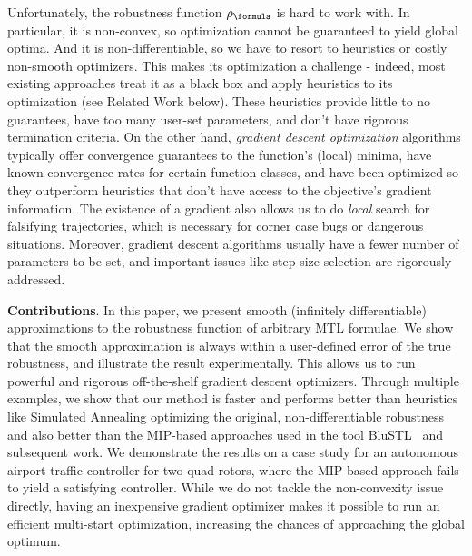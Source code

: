 Unfortunately, the robustness function $\robf$ is hard to work with.
In particular, it is non-convex, so optimization cannot be guaranteed to yield global optima.
And it is non-differentiable, so we have to resort to heuristics or costly non-smooth optimizers. 
This makes its optimization a challenge - indeed, most existing approaches treat it as a black box and apply heuristics to its optimization (see Related Work below).
These heuristics provide little to no guarantees, have too many user-set parameters, and don't have rigorous termination criteria.
On the other hand, \textit{gradient descent optimization} algorithms typically offer convergence guarantees to the function's (local) minima, have known convergence rates for certain function classes, and have been optimized so they outperform heuristics that don't have access to the objective's gradient information.
The existence of a gradient also allows us to do \textit{local} search for falsifying trajectories, which is necessary for corner case bugs or dangerous situations.
Moreover, gradient descent algorithms usually have a fewer number of parameters to be set, and important issues like step-size selection are rigorously addressed.

\textbf{Contributions}. In this paper, we present smooth (infinitely differentiable) approximations to the robustness function of arbitrary MTL formulae.
We show that the smooth approximation is always within a user-defined error of the true robustness, and illustrate the result experimentally.
This allows us to run powerful and rigorous off-the-shelf gradient descent optimizers.
Through multiple examples, we show that our method is faster and performs better than heuristics like Simulated Annealing optimizing the original, non-differentiable robustness and also better than the MIP-based approaches used in the tool BluSTL~\cite{Raman14_MPCSTL} and subsequent work. 
We demonstrate the results on a case study for an autonomous airport traffic controller for two quad-rotors, where the MIP-based approach fails to yield a satisfying controller.
While we do not tackle the non-convexity issue directly, having an inexpensive gradient optimizer makes it possible to run an efficient multi-start optimization, increasing the chances of approaching the global optimum.

